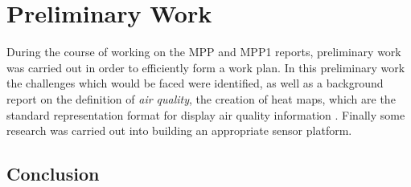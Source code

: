 \section{Preliminary Work}\label{preliminary}


During the course of working on the MPP and MPP1 reports, preliminary work was carried out in order to efficiently form a work plan. In this preliminary work the challenges which would be faced were identified, as well as a background report on the definition of \emph{air quality}, the creation of heat maps, which are the standard representation format for display air quality information . Finally some research was carried out into building an appropriate sensor platform.











\subsection{Conclusion}\label{preliminaryconclusion}

\begin{comment}
Conclusion is finding the right approach to deployment and what sort of gases should I measure and the platform I should use (how can I engineer a platform based on this device)
\end{comment}

